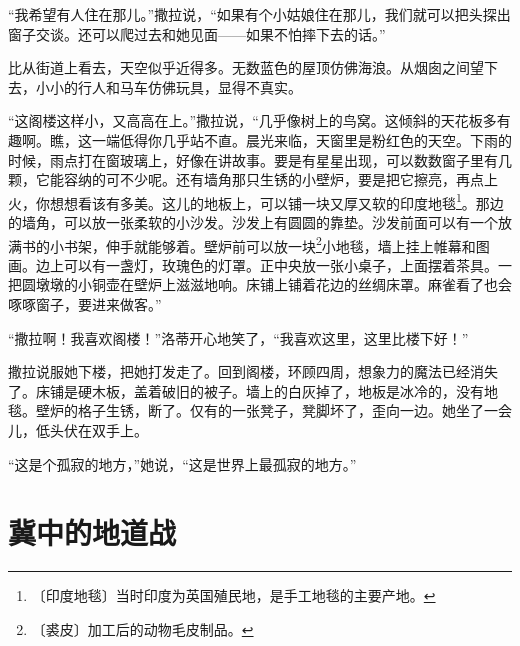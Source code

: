 \documentclass[12pt,UTF-8,openany]{ctexbook}
\begin{document}
\begin{Large}
    “我希望有人住在那儿。”撒拉说，“如果有个小姑娘住在那儿，我们就可以把头探出窗子交谈。还可以爬过去和她见面——如果不怕摔下去的话。”
    
    比从街道上看去，天空似乎近得多。无数蓝色的屋顶仿佛海浪。从烟囱之间望下去，小小的行人和马车仿佛玩具，显得不真实。
    
    “这阁楼这样小，又高高在上。”撒拉说，“几乎像树上的鸟窝。这倾斜的天花板多有趣啊。瞧，这一端低得你几乎站不直。晨光来临，天窗里是粉红色的天空。下雨的时候，雨点打在窗玻璃上，好像在讲故事。要是有星星出现，可以数数窗子里有几颗，它能容纳的可不少呢。还有墙角那只生锈的小壁炉，要是把它擦亮，再点上火，你想想看该有多美。这儿的地板上，可以铺一块又厚又软的印度地毯\footnote{〔印度地毯〕当时印度为英国殖民地，是手工地毯的主要产地。}。那边的墙角，可以放一张柔软的小沙发。沙发上有圆圆的靠垫。沙发前面可以有一个放满书的小书架，伸手就能够着。壁炉前可以放一块\footnote{〔裘皮〕加工后的动物毛皮制品。}小地毯，墙上挂上帷幕和图画。边上可以有一盏灯，玫瑰色的灯罩。正中央放一张小桌子，上面摆着茶具。一把圆墩墩的小铜壶在壁炉上滋滋地响。床铺上铺着花边的丝绸床罩。麻雀看了也会啄啄窗子，要进来做客。”
    
    “撒拉啊！我喜欢阁楼！”洛蒂开心地笑了，“我喜欢这里，这里比楼下好！”
    
    撒拉说服她下楼，把她打发走了。回到阁楼，环顾四周，想象力的魔法已经消失了。床铺是硬木板，盖着破旧的被子。墙上的白灰掉了，地板是冰冷的，没有地毯。壁炉的格子生锈，断了。仅有的一张凳子，凳脚坏了，歪向一边。她坐了一会儿，低头伏在双手上。
    
    “这是个孤寂的地方，”她说，“这是世界上最孤寂的地方。”
    
\end{Large}

\chapter{冀中的地道战}
\end{document}
